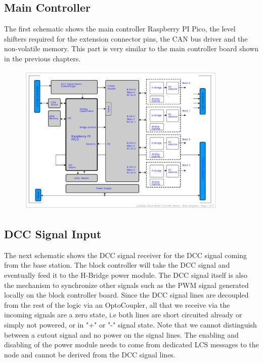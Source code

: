 \subsection{Main Controller}

The first schematic shows the main controller Raspberry PI Pico, the level shifters required for the extension connector pins, the CAN bus driver and the non-volatile memory. This part is very similar to the main controller board shown in the previous chapters.

\begin{figure}[htbp]
    \centering
    \includegraphics[page=2, width=0.9\textwidth]{./Schematics/Schematic_LcsNodes-Quad-Block-Controller.pdf}
\end{figure}
\FloatBarrier

\subsection{DCC Signal Input}

The next schematic shows the DCC signal receiver for the DCC signal coming from the base station. The block controller will take the DCC signal and eventually feed it to the H-Bridge power module. The DCC signal itself is also the mechanism to synchronize other signals such as the PWM signal generated locally on the block controller board. Since the DCC signal lines are decoupled from the rest of the logic via an OptoCoupler, all that we receive via the incoming signals are a zero state, i.e both lines are short circuited already or simply not powered, or in "+" or "-" signal state. Note that we cannot distinguish between a cutout signal and no power on the signal lines. The enabling and disabling of the power module needs to come from dedicated LCS messages to the node and cannot be derived from the DCC signal lines.

